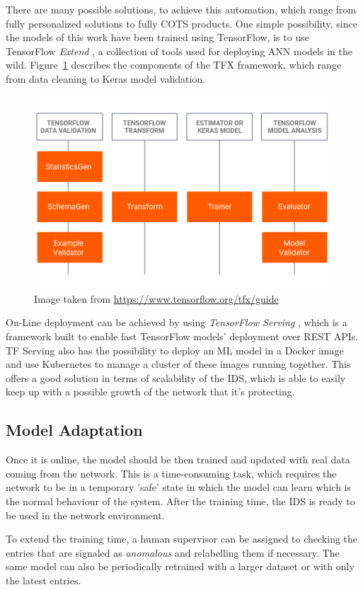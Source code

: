 There are many possible solutions, to achieve this automation, which range from fully personalized solutions to fully COTS products. One simple possibility, since the models of this work have been trained using TensorFlow, is to use TensorFlow \textit{Extend} \cite{tfx}, a collection of tools used for deploying ANN models in the wild. Figure~\ref{fig:tfx} describes the components of the TFX framework, which range from data cleaning to Keras model validation.

\begin{figure}[h]
    \centering
    \includegraphics[width=\linewidth]{img/tfx.png}
    \caption{Image taken from \url{https://www.tensorflow.org/tfx/guide}}
    \label{fig:tfx}
\end{figure}

On-Line deployment can be achieved by using \textit{TensorFlow Serving} \cite{tfserve}, which is a framework built to enable fast TensorFlow models' deployment over REST APIs. TF Serving also has the possibility to deploy an ML model in a Docker image and use Kubernetes to manage a cluster of these images running together. This offers a good solution in terms of scalability of the IDS, which is able to easily keep up with a possible growth of the network that it's protecting.

\subsection{Model Adaptation}

Once it is online, the model should be then trained and updated with real data coming from the network. This is a time-consuming task, which requires the network to be in a temporary 'safe' state in which the model can learn which is the normal behaviour of the system. After the training time, the IDS is ready to be used in the network environment.

To extend the training time, a human supervisor can be assigned to checking the entries that are signaled as \textit{anomalous} and relabelling them if necessary. The same model can also be periodically retrained with a larger dataset or with only the latest entries.
